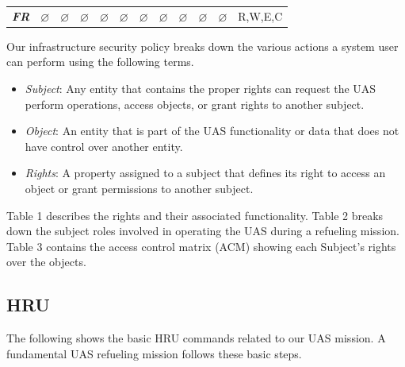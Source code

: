 \documentclass[10pt,journal,compsoc]{IEEEtran}
\begin{document}
\begin{table}[]
{\begin{tabular}{l|lllllllllll}
      {\color[HTML]{009901} \textit{\textbf{FR}}} & {\color[HTML]{009901} $\varnothing$} & {\color[HTML]{009901} $\varnothing$} & {\color[HTML]{009901} $\varnothing$} & {\color[HTML]{009901} $\varnothing$} & {\color[HTML]{009901} $\varnothing$} & {\color[HTML]{009901} $\varnothing$} & {\color[HTML]{009901} $\varnothing$} & {\color[HTML]{009901} $\varnothing$} & {\color[HTML]{009901} $\varnothing$} & {\color[HTML]{009901} $\varnothing$} & {\color[HTML]{009901} R,W,E,C}      
    \end{tabular}}
  \end{table}

  Our infrastructure security policy breaks down the various actions a system user can perform using the following terms. 

  \begin{itemize}
    \item \textit{Subject}: Any entity that contains the proper rights can request the UAS perform operations, access objects, or grant rights to another subject.
    \item \textit{Object}: An entity that is part of the UAS functionality or data that does not have control over another entity. 
    \item \textit{Rights}: A property assigned to a subject that defines its right to access an object or grant permissions to another subject.
  \end{itemize}
  
  Table 1 describes the rights and their associated functionality. Table 2 breaks down the subject roles involved in operating the UAS during a refueling mission. Table 3 contains the access control matrix (ACM) showing each Subject's rights over the objects.
  
  \subsection{HRU}
  
  The following shows the basic HRU commands related to our UAS mission.
  A fundamental UAS refueling mission follows these basic steps. 
\end{document}
